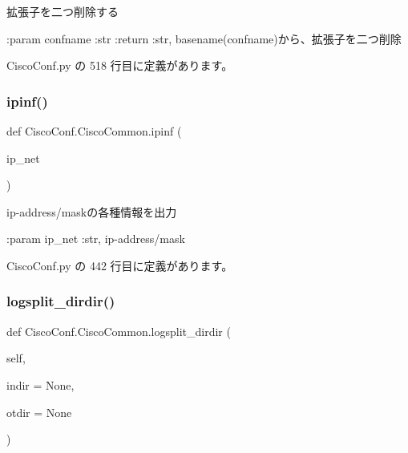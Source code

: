 \begin{DoxyVerb}拡張子を二つ削除する

:param confname :str
:return :str, basename(confname)から、拡張子を二つ削除
\end{DoxyVerb}
 

 Cisco\+Conf.\+py の 518 行目に定義があります。

\mbox{\label{classCiscoConf_1_1CiscoCommon_a49f3f3f5f53737dfdca08f3840c01237}} 
\subsubsection{\texorpdfstring{ipinf()}{ipinf()}}
{\footnotesize\ttfamily def Cisco\+Conf.\+Cisco\+Common.\+ipinf (\begin{DoxyParamCaption}\item[{}]{ip\+\_\+net }\end{DoxyParamCaption})\hspace{0.3cm}{\ttfamily [static]}}

\begin{DoxyVerb}ip-address/maskの各種情報を出力

:param ip_net :str, ip-address/mask
\end{DoxyVerb}
 

 Cisco\+Conf.\+py の 442 行目に定義があります。

\mbox{\label{classCiscoConf_1_1CiscoCommon_a531da618ef913a6f96c313a12cda2d78}} 
\subsubsection{\texorpdfstring{logsplit\_dirdir()}{logsplit\_dirdir()}}
{\footnotesize\ttfamily def Cisco\+Conf.\+Cisco\+Common.\+logsplit\+\_\+dirdir (\begin{DoxyParamCaption}\item[{}]{self,  }\item[{}]{indir = {\ttfamily None},  }\item[{}]{otdir = {\ttfamily None} }\end{DoxyParamCaption})}

